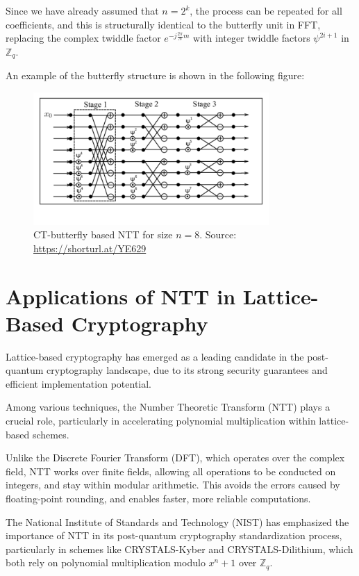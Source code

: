 \documentclass[12pt]{article}
\begin{document}
Since we have already assumed that $n = 2^k$, the process can be repeated for all coefficients, 
and this is structurally identical to the butterfly unit in FFT, 
replacing the complex twiddle factor $e^{-j\frac{2\pi}{N}m}$ with integer twiddle factors $\psi^{2i+1}$ in $\mathbb{Z}_q$.
\cite[p.~12]{beginner_guide}

An example of the butterfly structure is shown in the following figure:

\begin{figure}[H]
    \centering
    \includegraphics[width=0.8\textwidth]{Final_img/NTT_butterfly_ex.png}
    \caption{CT-butterfly based NTT for size $n=8$. Source: \url{https://shorturl.at/YE629}}
    \label{fig:NTT_butterfly_ex}
\end{figure}


\section{Applications of NTT in Lattice-Based Cryptography}

Lattice-based cryptography has emerged as a leading candidate in the post-quantum cryptography landscape, 
due to its strong security guarantees and efficient implementation potential. 

Among various techniques, the Number Theoretic Transform (NTT) plays a crucial role, 
particularly in accelerating polynomial multiplication within lattice-based schemes. 

Unlike the Discrete Fourier Transform (DFT), which operates over the complex field, 
NTT works over finite fields, allowing all operations to be conducted on integers, and stay within modular arithmetic. 
This avoids the errors caused by floating-point rounding, 
and enables faster, more reliable computations. 

The National Institute of Standards and Technology (NIST) has emphasized the importance of NTT in its post-quantum cryptography standardization process, 
particularly in schemes like CRYSTALS-Kyber and CRYSTALS-Dilithium, 
which both rely on polynomial multiplication modulo $x^n + 1$ over $\mathbb{Z}_q$. 
\cite[p.~2]{fpga}
\end{document}
